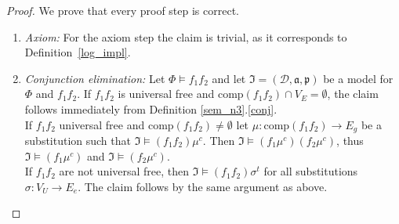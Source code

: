 
\begin{proof}

We prove that every proof step is correct.
\begin{enumerate}
\leftskip2.5em %
 \item \emph{Axiom:} For the axiom step the claim is trivial, as it corresponds to Definition~\ref{log_impl}.
 \item \emph{Conjunction elimination:}
 Let $\Phi\models f_1 f_2 $ and let  $\mathfrak{I}=(\mathcal{D},\mathfrak{a,p})$ be a model for $\Phi$ and $f_1 f_2$. 
 If $f_1 f_2$ is universal free and $\text{comp}(f_1f_2)\cap V_E=\emptyset$, the claim follows immediately 
 from Definition  \ref{sem_n3}.\ref{conj}. \\
 If $f_1f_2$ universal free and $\text{comp}(f_1f_2)\neq \emptyset$ let $\mu:\text{comp}(f_1f_2)\rightarrow E_g$ be a substitution such that
 $\mathfrak{I}\models (f_1f_2)\mu^c$. Then $\mathfrak{I}\models (f_1\mu^c) (f_2\mu^c)$, thus  $\mathfrak{I}\models (f_1\mu^c)$ and 
 $\mathfrak{I}\models (f_2\mu^c)$.\\
 If $f_1f_2$ are not universal free, then $\mathfrak{I}\models (f_1f_2)\sigma^t$ for all substitutions $\sigma:V_U\rightarrow E_e$. 
 The claim follows by the same 
 argument as above.

\end{enumerate}
\end{proof}
